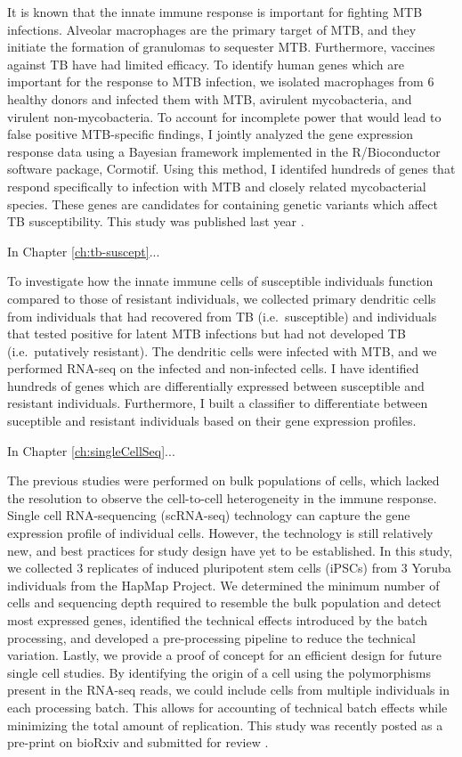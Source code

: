 It is known that the innate immune response is important for fighting
MTB infections. Alveolar macrophages are the primary target of MTB,
and they initiate the formation of granulomas to sequester
MTB. Furthermore, vaccines against TB have had limited efficacy. To
identify human genes which are important for the response to MTB
infection, we isolated macrophages from 6 healthy donors and infected
them with MTB, avirulent mycobacteria, and virulent
non-mycobacteria. To account for incomplete power that would lead to
false positive MTB-specific findings, I jointly analyzed the gene
expression response data using a Bayesian framework implemented in the
R/Bioconductor software package, Cormotif. Using this method, I
identifed hundreds of genes that respond specifically to infection
with MTB and closely related mycobacterial species. These genes are
candidates for containing genetic variants which affect TB
susceptibility. This study was published last year
\citep{Blischak2015}.

In Chapter \ref{ch:tb-suscept}...

To investigate how the innate immune cells of susceptible individuals
function compared to those of resistant individuals, we collected
primary dendritic cells from individuals that had recovered from TB
(i.e.~susceptible) and individuals that tested positive for latent MTB
infections but had not developed TB (i.e.~putatively resistant). The
dendritic cells were infected with MTB, and we performed RNA-seq on
the infected and non-infected cells. I have identified hundreds of
genes which are differentially expressed between susceptible and
resistant individuals. Furthermore, I built a classifier to
differentiate between suceptible and resistant individuals based on
their gene expression profiles.

In Chapter \ref{ch:singleCellSeq}...

The previous studies were performed on bulk populations of cells,
which lacked the resolution to observe the cell-to-cell heterogeneity
in the immune response. Single cell RNA-sequencing (scRNA-seq)
technology can capture the gene expression profile of individual
cells. However, the technology is still relatively new, and best
practices for study design have yet to be established. In this study,
we collected 3 replicates of induced pluripotent stem cells (iPSCs)
from 3 Yoruba individuals from the HapMap Project. We determined the
minimum number of cells and sequencing depth required to resemble the
bulk population and detect most expressed genes, identified the
technical effects introduced by the batch processing, and developed a
pre-processing pipeline to reduce the technical variation. Lastly, we
provide a proof of concept for an efficient design for future single
cell studies. By identifying the origin of a cell using the
polymorphisms present in the RNA-seq reads, we could include cells
from multiple individuals in each processing batch. This allows for
accounting of technical batch effects while minimizing the total
amount of replication. This study was recently posted as a pre-print
on bioRxiv and submitted for review \citep{Tung2016}.

